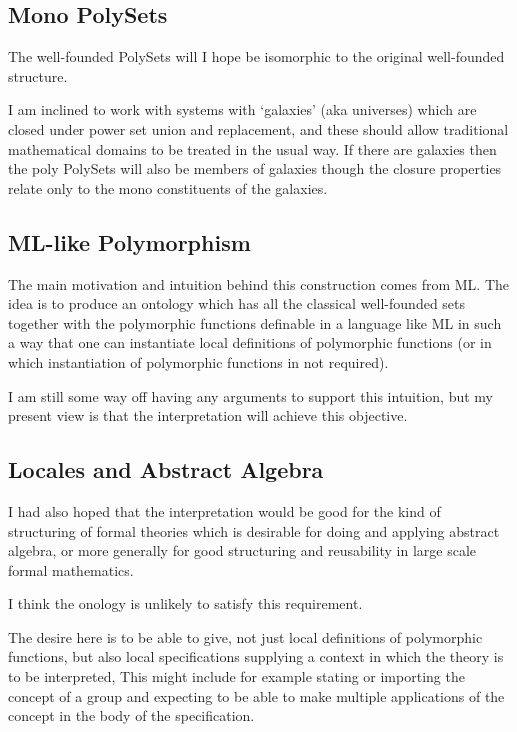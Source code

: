 \documentclass[numreferences]{rbjk}
\begin{document}
\begin{article}
\subsection{Mono PolySets}

The well-founded PolySets will I hope be isomorphic to the original well-founded structure.

I am inclined to work with systems with `galaxies' (aka universes) which are closed under power set union and replacement, and these should allow traditional mathematical domains to be treated in the usual way.
If there are galaxies then the poly PolySets will also be members of galaxies though the closure properties relate only to the mono constituents of the galaxies.

\subsection{ML-like Polymorphism}

The main motivation and intuition behind this construction comes from ML.
The idea is to produce an ontology which has all the classical well-founded sets together with the polymorphic functions definable in a language like ML in such a way that one can instantiate local definitions of polymorphic functions (or in which instantiation of polymorphic functions in not required).

I am still some way off having any arguments to support this intuition, but my present view is that the interpretation will achieve this objective.

\subsection{Locales and Abstract Algebra}

I had also hoped that the interpretation would be good for the kind of structuring of formal theories which is desirable for doing and applying abstract algebra, or more generally for good structuring and reusability in large scale formal mathematics.

I think the onology is unlikely to satisfy this requirement.

The desire here is to be able to give, not just local definitions of polymorphic functions, but also local specifications supplying a context in which the theory is to be interpreted,
This might include for example stating or importing the concept of a group and expecting to be able to make multiple applications of the concept in the body of the specification.


\end{article}
\end{document}
